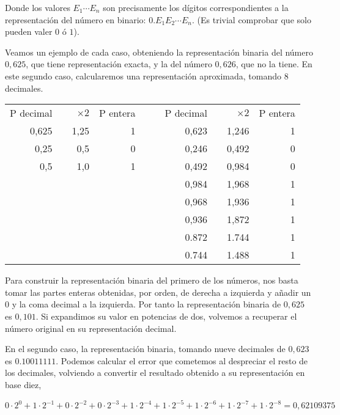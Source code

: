 Donde los valores $E_1\cdots E_n$ son precisamente los dígitos correspondientes a la representación del número en binario: $0.E_1E_2\cdots E_n$. (Es trivial comprobar que solo pueden valer $0$ ó $1$).


Veamos un ejemplo de cada caso, obteniendo la representación binaria del número $0,625$, que tiene representación exacta, y la del número $0,626$, que no la tiene. En este segundo caso, calcularemos una representación aproximada, tomando 8 decimales.

\begin{table}[h]
\begin{tabular}{|r|r|r|r|r r|r|r|r|r|}
P decimal& &$\times 2$& P entera& &&P decimal& &$\times 2$& P entera\\
\cline{1-4}
\cline{7-10}
0,625& &1,25&1& &&0,623& &1,246&1\\
0,25  & &0,5  &0& &&0,246& &0,492&0\\
0,5    & &1,0  &1& &&0,492& &0,984&0\\
         & &       &  & &&0,984& &1,968&1\\
         & &       &  & &&0,968& &1,936&1\\
         & &       &  & &&0,936& &1,872&1\\
         & &       &  & &&0.872& &1.744&1\\
         & &       &  & &&0.744& &1.488&1\\
\end{tabular}
\end{table}

Para construir la representación binaria del primero de los números, nos basta tomar las partes enteras obtenidas, por orden, de derecha a izquierda y añadir un $0$ y la coma decimal a la izquierda. Por tanto  la representación binaria de $0,625$ es $0,101$.  Si expandimos su valor en potencias de dos, volvemos a recuperar el número original en su representación decimal.

 En el segundo caso, la representación binaria, tomando nueve decimales de $0,623$ es $0.10011111$. Podemos calcular el error que cometemos al despreciar el resto de los decimales, volviendo a convertir el resultado obtenido a su representación en base diez,

 \begin{equation*}
0\cdot 2^{0}+1\cdot 2^{-1}+0\cdot 2^{-2}+ 0\cdot 2^{-3}+1\cdot 2^{-4}+1\cdot 2^{-5}+ 1\cdot 2^{-6}+1\cdot 2^{-7}+1\cdot 2^{-8}=0,62109375
\end{equation*} 

